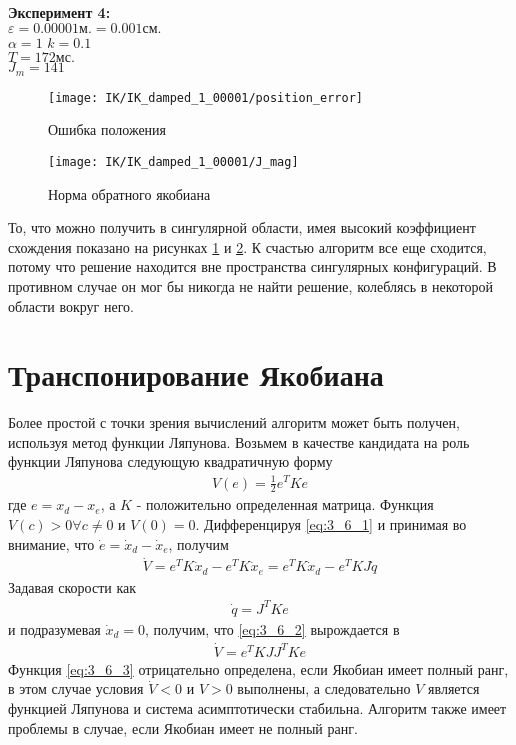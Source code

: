 \textbf{Эксперимент 4:}\\
$\varepsilon = 0.00001\text{м.} = 0.001\text{см.}$\\
$\alpha = 1$
$k = 0.1$\\
$T = 172 \text{мс.}$\\
$J_{m} = 141$

\begin{figure}[h!]
	\centering
	\texttt{[image: IK/IK\_damped\_1\_00001/position\_error]}
	\caption{Ошибка положения}
	\label{fig:3_5_7}
\end{figure}
\begin{figure}[h!]
	\centering
	\texttt{[image: IK/IK\_damped\_1\_00001/J\_mag]}
	\caption{Норма обратного якобиана}
	\label{fig:3_5_8}
\end{figure}
То, что можно получить в сингулярной области, имея высокий коэффициент схождения показано на рисунках \ref{fig:3_5_7} и \ref{fig:3_5_8}. К счастью алгоритм все еще сходится, потому что решение находится вне пространства сингулярных конфигураций. В противном случае он мог бы никогда не найти решение, колеблясь в некоторой области вокруг него.

\section{Транспонирование Якобиана} \label{sect:3_6}
Более простой с точки зрения вычислений алгоритм может быть получен, используя метод функции Ляпунова.\cite{Bruno}
Возьмем в качестве кандидата на роль функции Ляпунова следующую квадратичную форму
\begin{align} \label{eq:3_6_1}
	V(e) = \frac{1}{2}e^{T}Ke
\end{align}
где $e = x_{d} - x_{e}$, а $K$ - положительно определенная матрица. Функция $V(c) > 0 \forall c \neq 0$ и $V(0) = 0$. Дифференцируя \ref{eq:3_6_1} и принимая во внимание, что $\dot{e} = \dot{x}_{d} - \dot{x}_{e}$, получим
\begin{align}\label{eq:3_6_2}
	\dot{V} = e^{T}K\dot{x}_{d} - e^{T}K\dot{x}_{e} = e^{T}K\dot{x}_{d} - e^{T}KJ\dot{q}
\end{align}
Задавая скорости как
\begin{align*}
	\dot{q} = J^{T}Ke
\end{align*}
и подразумевая $\dot{x}_{d} = 0$, получим, что \ref{eq:3_6_2} вырождается в 
\begin{align} \label{eq:3_6_3}
	\dot{V} = e^{T}KJJ^{T}Ke
\end{align}
Функция \ref{eq:3_6_3} отрицательно определена, если Якобиан имеет полный ранг, в этом случае условия $\dot{V} < 0$ и $V > 0$ выполнены, а следовательно $V$ является функцией Ляпунова и система асимптотически стабильна. Алгоритм также имеет проблемы в случае, если Якобиан имеет не полный ранг.

